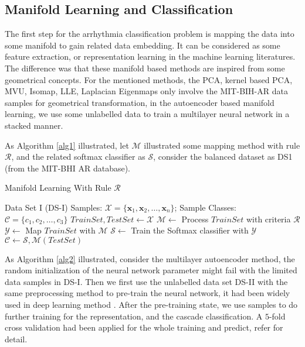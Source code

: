 \documentclass[journal]{IEEEtran}
\begin{document}
%
%                
%
     
     
\subsection{Manifold Learning and Classification}
The first step for the arrhythmia classification problem is mapping the data into some manifold to gain related data embedding. It can be considered as some feature extraction, or representation learning in the machine learning literatures.
The difference was that these manifold based methods are inspired from some geometrical concepts.
For the mentioned methods, the PCA, kernel based PCA, MVU, Isomap, LLE, Laplacian Eigenmaps only involve the MIT-BIH-AR data samples for geometrical transformation, in the autoencoder based manifold learning, we use some unlabelled data to train a multilayer neural network in a stacked manner.

As Algorithm \ref{alg1} illustrated, let $\mathcal{M}$ illustrated some mapping method with rule $\mathcal{R}$, and the related softmax classifier as $\mathcal{S}$, consider the balanced dataset as DS1 (from the MIT-BHI AR database). 

\begin{algorithm}
 \caption{Manifold Learning With Rule $\mathcal{R}$}
 \label{alg1}
 \begin{algorithmic}
 \REQUIRE Data Set I (DS-I) Samples: $ \mathcal{X} = \{\bm{x}_1, \bm{x}_2, \ldots, \bm{x}_n\}$;
 \ENSURE Sample Classes: $\mathcal{C} = \{c_1, c_2, \ldots, c_3\}$
 \STATE $TrainSet, TestSet \leftarrow \mathcal{X}$
 \STATE $\mathcal{M} \leftarrow $ Process $TrainSet$ with criteria $\mathcal{R}$
 \STATE $\mathcal{Y} \leftarrow$ Map $TrainSet$ with $\mathcal{M}$ 
 \STATE $\mathcal{S} \leftarrow$ Train the Softmax classifier with $\mathcal{Y}$
 \STATE $\mathcal{C} \leftarrow \mathcal{S}, \mathcal{M}(TestSet)$
  \end{algorithmic}
 \end{algorithm}


As Algorithm \ref{alg2} illustrated, consider the multilayer autoencoder method, the random initialization of the neural network parameter might fail with the limited data samples in DS-I. Then we first use the unlabelled data set DS-II with the same preprocessing method to pre-train the neural network, it had been widely used in deep learning method \cite{vincent2010stacked, goodfellow2016deep}. 
After the pre-training state, we use samples to do further training for the representation, and the cascade classification.
A $5$-fold cross validation had been applied for the whole training and predict, refer \cite{kohavi1995study} for detail.
\end{document}
